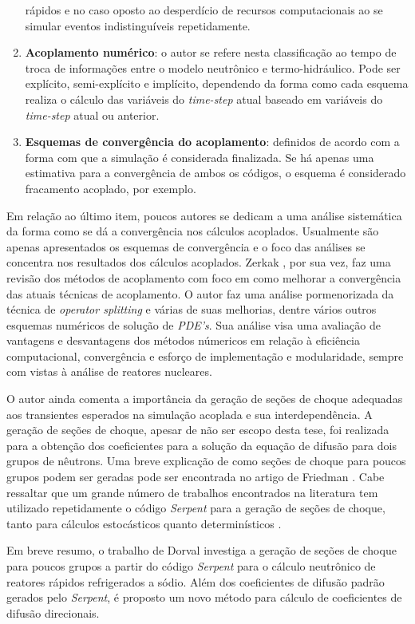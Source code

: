 \begin{enumerate}
rápidos e no caso oposto ao desperdício de recursos computacionais ao se simular eventos indistinguíveis repetidamente.
\item \textbf{Acoplamento numérico}: o autor se refere nesta classificação ao tempo de troca de informações entre o modelo 
neutrônico e termo-hidráulico. Pode ser explícito, semi-explícito e implícito, dependendo da forma como cada esquema 
realiza o cálculo das variáveis do \textit{time-step} atual baseado em variáveis do \textit{time-step} atual ou 
anterior.
\item \textbf{Esquemas de convergência do acoplamento}: definidos de acordo com a forma com que a simulação é considerada 
finalizada. Se há apenas uma estimativa para a convergência de ambos os códigos, o esquema é considerado fracamento 
acoplado, por exemplo.  
\end{enumerate}

Em relação ao último item, poucos autores se dedicam a uma análise sistemática da forma como se
dá a convergência nos cálculos acoplados. Usualmente são apenas apresentados os esquemas
de convergência e o foco das análises se concentra nos resultados dos cálculos acoplados.
Zerkak \cite{Zerkak2015}, por sua vez, faz uma revisão dos métodos de acoplamento com
foco em como melhorar a convergência das atuais técnicas de acoplamento. O autor faz uma
análise pormenorizada da técnica de \textit{operator splitting} e várias de suas melhorias,
dentre vários outros esquemas numéricos de solução de \textit{PDE's}. Sua análise visa
uma avaliação de vantagens e desvantagens dos métodos númericos em relação à eficiência
computacional, convergência e esforço de implementação e modularidade, sempre com vistas
à análise de reatores nucleares.

O autor ainda comenta a importância da geração de seções de choque adequadas aos transientes esperados na 
simulação acoplada e sua interdependência. A geração de seções de choque, apesar de não ser escopo desta tese,
foi realizada para a obtenção dos coeficientes para a solução da equação de difusão para dois grupos de nêutrons.
Uma breve explicação de como seções de choque para poucos grupos podem ser geradas pode ser encontrada no
artigo de Friedman \cite{Friedman2013}. Cabe ressaltar que um grande número de trabalhos encontrados
na literatura tem utilizado repetidamente o código \textit{Serpent} \cite{Serpent2013} para
a geração de seções de choque, tanto para cálculos estocásticos quanto determinísticos \cite{Jareteg2014}.

Em breve resumo, o trabalho de Dorval \cite{Dorval2015} investiga
a geração de seções de choque para poucos grupos a partir do código \textit{Serpent} para
o cálculo neutrônico de reatores rápidos refrigerados a sódio. Além dos coeficientes de
difusão padrão gerados pelo \textit{Serpent}, é proposto um novo método para cálculo de
coeficientes de difusão direcionais. 

